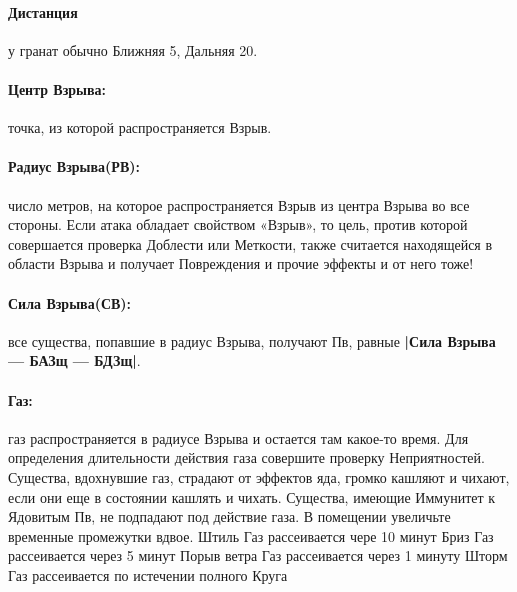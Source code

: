 \paragraph{Дистанция} у гранат обычно Ближняя 5, Дальняя 20.
\paragraph{Центр Взрыва:} точка, из которой распространяется Взрыв.
\paragraph{Радиус Взрыва(РВ):} число метров, на которое распространяется Взрыв из центра Взрыва во все стороны. Если атака обладает свойством «Взрыв», то цель, против которой совершается проверка Доблести или Меткости, также считается находящейся в области Взрыва и получает Повреждения и прочие эффекты и от него тоже!
\paragraph{Сила Взрыва(СВ):} все существа, попавшие в радиус Взрыва, получают Пв, равные \textbf{|Сила Взрыва — БАЗщ — БДЗщ|}.
\paragraph{Газ:} газ распространяется в радиусе Взрыва и остается там какое-то время. Для определения длительности действия газа совершите проверку Неприятностей. Существа, вдохнувшие газ, страдают от эффектов яда, громко кашляют и чихают, если они еще в состоянии кашлять и чихать. Существа, имеющие Иммунитет к Ядовитым Пв, не подпадают под действие газа. В помещении увеличьте временные промежутки вдвое.
\trouble
{Штиль}%
{Газ рассеивается чере 10 минут}%
{Бриз}%
{Газ рассеивается через 5 минут}%
{Порыв ветра}%
{Газ рассеивается через 1 минуту}%
{Шторм}%
{Газ рассеивается по истечении полного Круга}%

